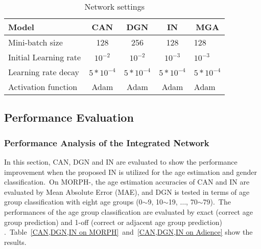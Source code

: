 \documentclass[10pt,twocolumn,letterpaper]{article}
\begin{document}
\begin{table}[!h]
\centering
\caption{Network settings}
\label{Network setting}

\begin{adjustbox}{width=0.48\textwidth}
\begin{tabular}{lcccl}
\hline
Model & CAN & DGN & IN & \multicolumn{1}{c}{MGA} \\ \hline
Mini-batch size & 128 & 256 & 128 & 128 \\
Initial Learning rate & $10^{-2}$ & $10^{-2}$ & $10^{-3}$ & $10^{-3}$ \\
Learning rate decay & $5*10^{-4}$ & $5*10^{-4}$ & $5*10^{-4}$ & $5*10^{-4}$ \\
Activation function & Adam & Adam & Adam & Adam \\ \hline
\end{tabular}
\end{adjustbox}
\end{table}


\subsection{Performance Evaluation}

\subsubsection{Performance Analysis of the Integrated Network}
In this section, CAN, DGN and IN are evaluated to show the performance improvement when the proposed IN is utilized for the age estimation and gender classification.~On MORPH-, the age estimation accuracies of CAN and IN are evaluated by Mean Absolute Error (MAE), and DGN is tested in terms of age group classification with eight age groups (0$\sim$9, 10$\sim$19, $\ldots$, 70$\sim$79).~The performances of the age group classification are evaluated by exact (correct age group prediction) and 1-off (correct or adjacent age group prediction) \cite{Zhang2017}.~Table~\ref{CAN,DGN,IN on MORPH}~and~\ref{CAN,DGN,IN on Adience} show the results.
\end{document}
